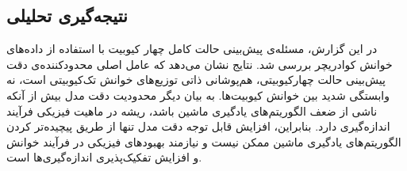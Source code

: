 \subsection*{نتیجه‌گیری تحلیلی}
در این گزارش، مسئله‌ی پیش‌بینی حالت کامل چهار کیوبیت با استفاده از داده‌های خوانش کوادریچر بررسی شد. نتایج نشان می‌دهد که عامل اصلی محدودکننده‌ی دقت پیش‌بینی حالت چهارکیوبیتی، هم‌پوشانی ذاتی توزیع‌های خوانش تک‌کیوبیتی است، نه وابستگی شدید بین خوانش کیوبیت‌ها. به بیان دیگر محدودیت دقت مدل بیش از آنکه ناشی از ضعف الگوریتم‌های یادگیری ماشین باشد، ریشه در ماهیت فیزیکی فرآیند اندازه‌گیری دارد. بنابراین، افزایش قابل توجه دقت مدل تنها از طریق پیچیده‌تر کردن الگوریتم‌های یادگیری ماشین ممکن نیست و نیازمند بهبودهای فیزیکی در فرآیند خوانش و افزایش تفکیک‌پذیری اندازه‌گیری‌ها است.

